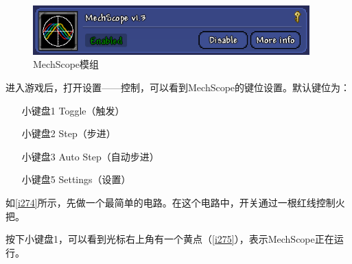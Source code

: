 \begin{figure}[!ht]
\includegraphics[width=0.95\textwidth]{images/273.png}
\caption{MechScope模组}\label{i273}
\end{figure}

进入游戏后，打开设置——控制，可以看到MechScope的键位设置。默认键位为：
\begin{itemize}
\item[小键盘1] Toggle（触发）
\item[小键盘2] Step（步进）
\item[小键盘3] Auto Step（自动步进）
\item[小键盘5] Settings（设置）
\end{itemize}

如\autoref{i274}所示，先做一个最简单的电路。在这个电路中，开关通过一根红线控制火把。
\begin{figure}[!ht]
\begin{center}
\qquad
{}
\end{center}
\caption{}
\end{figure}

按下小键盘1，可以看到光标右上角有一个黄点（\autoref{i275}），表示MechScope正在运行。
\begin{figure}[!ht]
\begin{center}
\qquad
{}
\end{center}
\caption{}
\end{figure}


